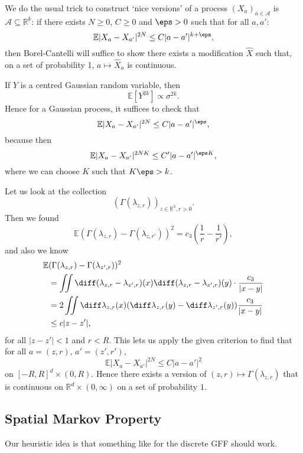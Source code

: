 \documentclass[12pt]{article}
\begin{document}

We do the usual trick to construct `nice versions' of a process $(X_a)_{a \in \mathcal{A}}$ is $\mathcal{A} \subseteq \mathbb{R}^{k}$: if there exists $N \geq 0$, $C \geq 0$ and $\eps > 0$ such that for all $a, a'$:
\[
\mathbb{E} |X_a - X_{a'}|^{2N} \leq C |a - a'|^{k + \eps},
\]
then Borel-Cantelli will suffice to show there exists a modification $\hat X$ such that, on a set of probability 1, $a \mapsto \hat X_a$ is continuous.

\begin{remark}
	If $Y$ is a centred Gaussian random variable, then
	\[
	\mathbb{E}[Y^{2k}] \propto \sigma^{2k}.
	\]
	Hence for a Gaussian process, it suffices to check that
	\[
	\mathbb{E} |X_a - X_{a'}|^{2N} \leq C |a - a'|^{\eps},
	\]
	because then
	\[
	\mathbb{E} |X_a - X_{a'}|^{2NK} \leq C' |a - a'|^{\eps K},
	\]
	where we can choose $K$ such that $K \eps > k$.
\end{remark}

Let us look at the collection
\[
	(\Gamma(\lambda_{z, r}))_{z \in \mathbb{R}^3, r > 0}.
\]
Then we found
\[
	\mathbb{E} (\Gamma(\lambda_{z, r}) - \Gamma(\lambda_{z, r'}))^2 = c_3 \left( \frac 1r - \frac 1{r'} \right),
\]
and also we know
\begin{align*}
	\mathbb{E} &(\Gamma(\lambda_{z, r}) - \Gamma(\lambda_{z', r}))^2 \\
	&= \iint \diff (\lambda_{z, r} - \lambda_{z', r})(x) \diff (\lambda_{z, r} - \lambda_{z', r})(y) \cdot \frac{c_3}{|x - y|} \\
	&= 2 \iint \diff \lambda_{z, r}(x) (\diff \lambda_{z, r}(y) - \diff \lambda_{z', r}(y)) \frac{c_3}{|x - y|}  \\
	&\leq c|z - z'|,
\end{align*}
for all $|z - z'| < 1$ and $r < R$. This lets us apply the given criterion to find that for all $a = (z, r)$, $a' = (z', r')$,
\[
\mathbb{E} |X_a - X_{a'}|^{2N} \leq C |a - a'|^2
\]
on $[-R, R]^{d} \times (0, R)$. Hence there exists a version of $(z, r) \mapsto \Gamma(\lambda_{z, r})$ that is continuous on $\mathbb{R}^{d} \times (0, \infty)$ on a set of probability $1$.


\subsection{Spatial Markov Property}%
\label{sub:smp}

Our heuristic idea is that something like for the discrete GFF should work.
\end{document}
